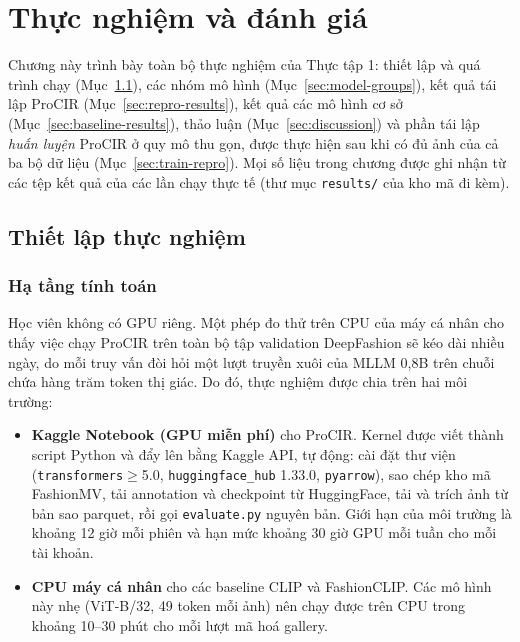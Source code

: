 \chapter{Thực nghiệm và đánh giá}\label{chapter:experiments}
\pagestyle{fancy}

Chương này trình bày toàn bộ thực nghiệm của Thực tập 1: thiết lập và quá trình chạy (Mục~\ref{sec:setup}), các nhóm mô hình (Mục~\ref{sec:model-groups}), kết quả tái lập ProCIR (Mục~\ref{sec:repro-results}), kết quả các mô hình cơ sở (Mục~\ref{sec:baseline-results}), thảo luận (Mục~\ref{sec:discussion}) và phần tái lập \emph{huấn luyện} ProCIR ở quy mô thu gọn, được thực hiện sau khi có đủ ảnh của cả ba bộ dữ liệu (Mục~\ref{sec:train-repro}). Mọi số liệu trong chương được ghi nhận từ các tệp kết quả của các lần chạy thực tế (thư mục \texttt{results/} của kho mã đi kèm).

\section{Thiết lập thực nghiệm}\label{sec:setup}

\subsection{Hạ tầng tính toán}

Học viên không có GPU riêng. Một phép đo thử trên CPU của máy cá nhân cho thấy việc chạy ProCIR trên toàn bộ tập validation DeepFashion sẽ kéo dài nhiều ngày, do mỗi truy vấn đòi hỏi một lượt truyền xuôi của MLLM 0,8B trên chuỗi chứa hàng trăm token thị giác. Do đó, thực nghiệm được chia trên hai môi trường:
\begin{itemize}
    \item \textbf{Kaggle Notebook (GPU miễn phí)} cho ProCIR. Kernel được viết thành script Python và đẩy lên bằng Kaggle API, tự động: cài đặt thư viện (\texttt{transformers}$\ge$5.0, \texttt{huggingface\_hub} 1.33.0, \texttt{pyarrow}), sao chép kho mã FashionMV, tải annotation và checkpoint từ HuggingFace, tải và trích ảnh từ bản sao parquet, rồi gọi \texttt{evaluate.py} nguyên bản. Giới hạn của môi trường là khoảng 12 giờ mỗi phiên và hạn mức khoảng 30 giờ GPU mỗi tuần cho mỗi tài khoản.
    \item \textbf{CPU máy cá nhân} cho các baseline CLIP và FashionCLIP. Các mô hình này nhẹ (ViT-B/32, 49 token mỗi ảnh) nên chạy được trên CPU trong khoảng 10--30 phút cho mỗi lượt mã hoá gallery.
\end{itemize}

